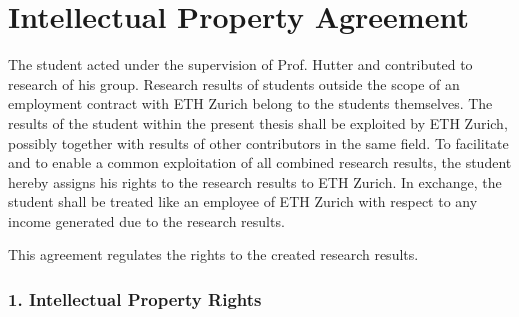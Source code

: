 
\section*{Intellectual Property Agreement}


The student acted under the supervision of Prof. Hutter and contributed to research of his group.
Research results of students outside the scope of an employment contract with ETH Zurich belong to the students themselves.
The results of the student within the present thesis shall be exploited by ETH Zurich, possibly together with results of other contributors in the same field.
To facilitate and to enable a common exploitation of all combined research results, the student hereby assigns his rights to the research results to ETH Zurich.
In exchange, the student shall be treated like an employee of ETH Zurich with respect to any income generated due to the research results.

This agreement regulates the rights to the created research results.



\subsubsection*{1. Intellectual Property Rights} 

